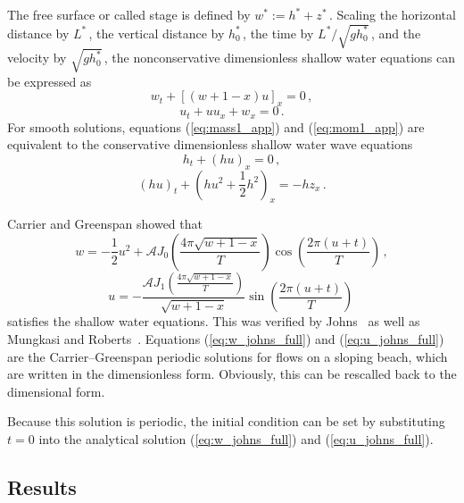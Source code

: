 The free surface or called stage is defined by $w^*:=h^*+z^*$\,.
Scaling the horizontal distance by $L^*$\,, the vertical distance by $h_0^*$\,, the time by $L^*/\sqrt{gh_0^*}$\,, and the velocity by $\sqrt{gh_0^*}$\,, the nonconservative dimensionless shallow water equations can be expressed as
\begin{equation} \label{eq:mass1_app}
w_t + \left[ \left( w+1-x  \right)u  \right]_{x} = 0\,,
\end{equation}
\begin{equation} \label{eq:mom1_app}
u_t + u u_x + w_{x} = 0\,.
\end{equation}
For smooth solutions, equations (\ref{eq:mass1_app}) and (\ref{eq:mom1_app}) are equivalent to the conservative dimensionless shallow water wave equations
\begin{equation}
h_t + \left( hu \right)_x = 0\,,
\end{equation}
\begin{equation}
\left(hu\right)_t + \left( hu^2 + \frac12 h^2  \right)_x = -h z_x\,.
\end{equation}


Carrier and Greenspan showed that
\begin{equation} \label{eq:w_johns_full}
w = - \frac12 u^2 + \mathcal{A} J_0 \left( \frac{4 \pi \sqrt{ w+1-x}}{T} \right) 
\cos{\left(\frac{2 \pi \left( u+t \right)}{T}\right)}\,,
\end{equation}
\begin{equation} \label{eq:u_johns_full}
u = - \frac{\mathcal{A}J_1\left( \frac{4 \pi \sqrt{w+1-x}}{T}  \right)}{\sqrt{w+1-x}}
 \sin{\left( \frac{2 \pi \left(u+t \right)}{T}  \right)}\,
\end{equation}
satisfies the shallow water equations. This was verified by Johns~\cite{Johns1982} as well as Mungkasi and Roberts~\cite{MR2012CG}. Equations (\ref{eq:w_johns_full}) and (\ref{eq:u_johns_full}) are the Carrier--Greenspan periodic solutions for flows on a sloping beach, which are written in the dimensionless form. Obviously, this can be rescalled back to the dimensional form.


Because this solution is periodic, the initial condition can be set by substituting $t=0$ into the analytical solution (\ref{eq:w_johns_full}) and (\ref{eq:u_johns_full}).


\subsection{Results}

